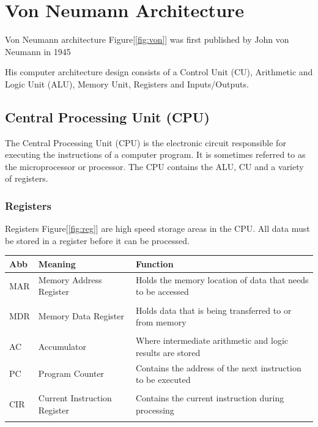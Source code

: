 \section{Von Neumann Architecture}
Von Neumann architecture Figure[\ref{fig:von}] was first published by John von Neumann in 1945

His computer architecture design consists of a Control Unit (CU), Arithmetic and Logic Unit (ALU), Memory Unit, Registers and Inputs/Outputs.



\begin{minipage}[c]{0.6\textwidth}
	\subsection{Central Processing Unit (CPU)}
	The Central Processing Unit (CPU) is the electronic circuit responsible for executing the instructions of a computer program. It is sometimes referred to as the microprocessor or processor.
	The CPU contains the ALU, CU and a variety of registers.
	\\
	\subsubsection{Registers}
	Registers Figure[\ref{fig:reg}] are high speed storage areas in the CPU. All data must be stored in a register before it can be processed.\\
		
	\begin{tabular}{p{1.5cm}p{3cm}p{3.5cm}}
		\toprule
		Abb & Meaning & Function \\
		\midrule
		MAR & Memory Address Register & Holds the memory location of data that needs to be accessed \\&&\\
		
		MDR&Memory Data Register&Holds data that is being transferred to or from memory\\&&\\
		
		AC&Accumulator&Where intermediate arithmetic and logic results are stored\\
		PC&Program Counter&Contains the address of the next instruction to be executed\\&&\\
		
		CIR&Current Instruction Register&Contains the current instruction during processing\\ \bottomrule & \captionof{table}{Registers}&\\
		
		
	\end{tabular}
\end{minipage}
